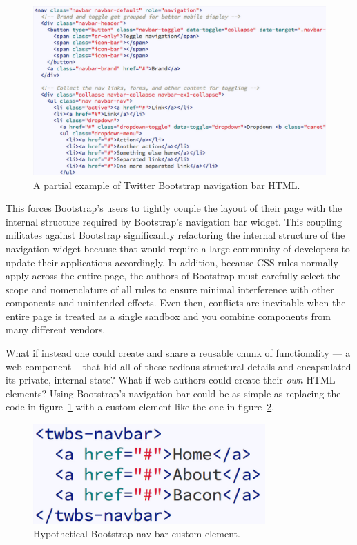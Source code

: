 % 
\begin{figure}[htb]
\centering
 \includegraphics[width=6in]{images/bootstrap_navbar_html.png}
\caption{A partial example of Twitter Bootstrap navigation bar HTML.}
\label{f:twbs1}
\end{figure}
%

This forces Bootstrap's users to tightly couple the layout of their page with the internal structure required by Bootstrap's navigation bar widget. 
This coupling militates against Bootstrap significantly refactoring the internal structure of the navigation widget because that would require a large community of developers to update their applications accordingly.
In addition, because CSS rules normally apply across the entire page, the authors of Bootstrap must carefully select the scope and nomenclature of all rules to ensure minimal interference with other components and unintended effects. 
Even then, conflicts are inevitable when the entire page is treated as a single sandbox and you combine components from many different vendors. 

What if instead one could create and share a reusable chunk of functionality --- a web component -- that hid all of these tedious structural details and encapsulated its private, internal state? 
What if web authors could create their \textit{own} HTML elements?  
Using Bootstrap's navigation bar could be as simple as replacing the code in figure~\ref{f:twbs1} with a custom element like the one in figure~\ref{f:twbs2}.

% 
\begin{figure}[htb]
\centering
 \includegraphics[width=3.5in]{images/bootstrap_navbar_wc.png}
\caption{Hypothetical Bootstrap nav bar custom element.}
\label{f:twbs2}
\end{figure}
%

